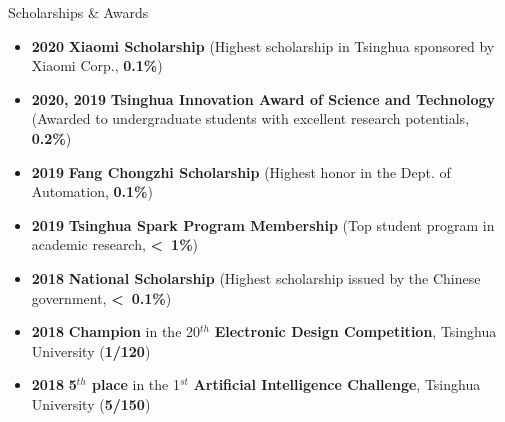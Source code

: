 \documentclass{resume} %
\begin{document}
\begin{rSection}{Scholarships \& Awards}
\begin{spacing}{1.05}
\begin{itemize}
    \item \textbf{2020} \textbf{Xiaomi Scholarship} (Highest scholarship in Tsinghua sponsored by Xiaomi Corp., \textbf{0.1\%})
    \item \textbf{2020, 2019} \textbf{Tsinghua Innovation Award of Science and Technology} (Awarded to undergraduate students with excellent research potentials, \textbf{0.2\%})
    \item \textbf{2019} \textbf{Fang Chongzhi Scholarship} (Highest honor in the Dept. of Automation, \textbf{0.1\%})
    \item \textbf{2019} \textbf{Tsinghua Spark Program Membership} (Top student program in academic research, \textbf{\textless~1\%})
    \item \textbf{2018} \textbf{National Scholarship} (Highest scholarship issued by the Chinese government, \textbf{\textless~0.1\%})
    \item \textbf{2018} \textbf{Champion} in the 20$^{th}$ \textbf{Electronic Design Competition}, Tsinghua University (\textbf{1/120})%
    \item \textbf{2018} \textbf{5$^{th}$ place} in the 1$^{st}$ \textbf{Artificial Intelligence Challenge}, Tsinghua University (\textbf{5/150})%
\end{itemize}
\end{spacing}

\end{rSection}
\end{document}
